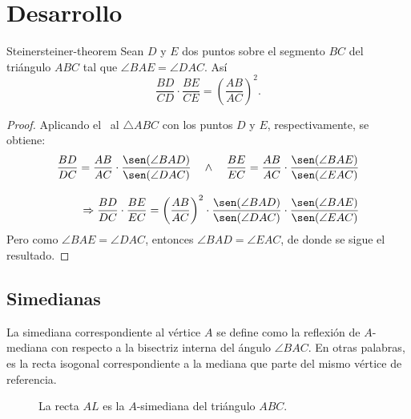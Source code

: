 \section{Desarrollo}




\begin{section-theorem.tcb}{Steiner}{steiner-theorem}
    Sean $D$ y $E$ dos puntos sobre el segmento $BC$ del triángulo $ABC$ tal que $\angle BAE = \angle DAC$.
    Así
    \[
        \frac{BD}{CD} \cdot \frac{BE}{CE} = \left(\frac{AB}{AC}\right)^2.
    \]
\end{section-theorem.tcb}

\begin{figure}[H]
    \centering
    
\end{figure}

\begin{proof}
    Aplicando el~ al $\triangle ABC$ con los puntos $D$ y $E$, respectivamente, se obtiene:
    \begin{align*}
        \frac{BD}{DC} = \frac{AB}{AC} \cdot \frac{\sen(\angle BAD)}{\sen(\angle DAC)} \quad \land \quad
        \frac{BE}{EC} = \frac{AB}{AC} \cdot \frac{\sen(\angle BAE)}{\sen(\angle EAC)} \\[3mm]
        \Rightarrow \frac{BD}{DC} \cdot \frac{BE}{EC} = \left(\frac{AB}{AC}\right)^2 \cdot \frac{\sen(\angle BAD)}{\sen(\angle DAC)} \cdot \frac{\sen(\angle BAE)}{\sen(\angle EAC)}
    \end{align*}
    Pero como $\angle BAE = \angle DAC$, entonces $\angle BAD = \angle EAC$, de donde se sigue el resultado.
\end{proof}




\subsection{Simedianas}

\begin{section-definition.tcb}[Simediana]
    La simediana correspondiente al vértice $A$ se define como la reflexión de $A$\nobreakdash-mediana con respecto a la bisectriz interna del ángulo $\angle BAC$.
    En otras palabras, es la recta isogonal correspondiente a la mediana que parte del mismo vértice de referencia.
\end{section-definition.tcb}

\begin{figure}[H]
    \centering
    
    \caption{La recta $AL$ es la $A$-simediana del triángulo $ABC$.}
    \label{fig:symmedian-definition}
\end{figure}

